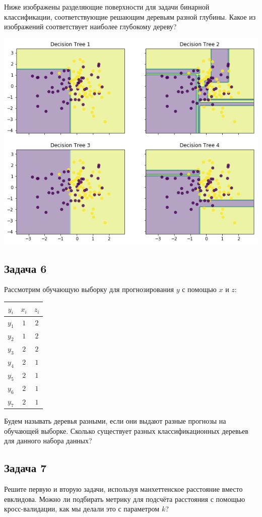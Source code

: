 \documentclass[12pt, a4paper, oneside]{article}
\begin{document}
Ниже изображены разделяющие поверхности для задачи бинарной классификации, соответствующие решающим деревьям разной глубины. Какое из изображений соответствует наиболее глубокому дереву?

\begin{center}
	\includegraphics[scale=0.7]{trees.png}
\end{center}


\subsection*{Задача 6} 

Рассмотрим обучающую выборку для прогнозирования $y$ с помощью $x$ и $z$:

\begin{center}
\begin{tabular}{c|c|c}
	\hline
	$y_i$ & $x_i$ & $z_i$ \\
\hline
	$y_1$ & $1$ & $2$ \\
	$y_2$ & $1$ & $2$ \\
	$y_3$ & $2$ & $2$ \\
	$y_4$ & $2$ & $1$\\
	$y_5$ & $2$ & $1$ \\
	$y_6$ & $2$ & $1$ \\
	$y_7$ & $2$ & $1$ \\
\end{tabular}
\end{center}

Будем называть деревья разными, если они выдают разные прогнозы на обучающей выборке.
Сколько существует разных классификационных деревьев  для данного набора данных?

\subsection*{Задача 7} 

Решите первую и вторую задачи, используя манхеттенское расстояние вместо евклидова. Можно ли подбирать метрику для подсчёта расстояния с помощью кросс-валидации, как мы делали это с параметром $k$? 
\end{document}
